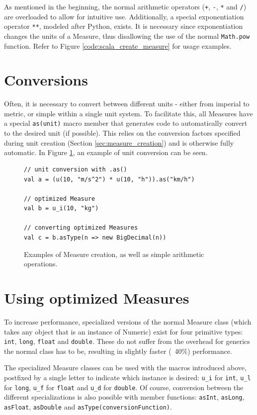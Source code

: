 \documentclass[12pt,oneside,a4paper]{scrbook}
\begin{document}
As mentioned in the beginning, the normal arithmetic operators (\verb|+|, \verb|-|, \verb|*| and \verb|/|) are overloaded to allow for intuitive use. Additionally, a special exponentiation operator \verb|**|, modeled after Python, exists. It is necessary since exponentiation changes the units of a Measure, thus disallowing the use of the normal \verb|Math.pow| function. Refer to Figure \ref{code:scala_create_measure} for usage examples.

\section{Conversions}

Often, it is necessary to convert between different units - either from imperial to metric, or simple within a single unit system. To facilitate this, all Measures have a special \verb|as(unit)| macro member that generates code to automatically convert to the desired unit (if possible). This relies on the conversion factors specified during unit creation (Section \ref{sec:measure_creation}) and is otherwise fully automatic. In Figure \ref{code:scala_measure_conversion}, an example of unit conversion can be seen.

\begin{figure}
\begin{verbatim}
// unit conversion with .as()
val a = (u(10, "m/s^2") * u(10, "h")).as("km/h")

// optimized Measure
val b = u_i(10, "kg")

// converting optimized Measures
val c = b.asType(n => new BigDecimal(n))
\end{verbatim}
\caption{Examples of Measure creation, as well as simple arithmetic operations.}
\label{code:scala_measure_conversion}
\end{figure}

\section{Using optimized Measures}

To increase performance, specialized versions of the normal Measure class (which takes any object that is an instance of Numeric) exist for four primitive types: \verb|int|, \verb|long|, \verb|float| and \verb|double|. These do not suffer from the overhead for generics the normal class has to be, resulting in slightly faster (~40\%) performance.

The specialized Measure classes can be used with the macros introduced above, postfixed by a single letter to indicate which instance is desired: \verb|u_i| for \verb|int|, \verb|u_l| for \verb|long|, \verb|u_f| for \verb|float| and \verb|u_d| for \verb|double|. Of course, conversion between the different specializations is also possible with member functions: \verb|asInt|, \verb|asLong|, \verb|asFloat|, \verb|asDouble| and \verb|asType(conversionFunction)|.
\end{document}
